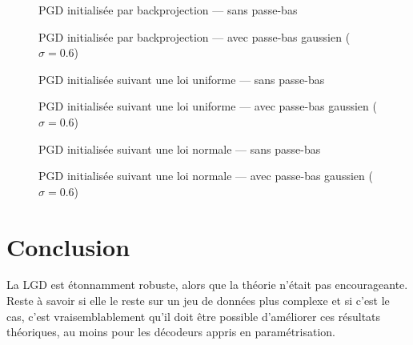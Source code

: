 \documentclass[hidelinks, french]{article} %
\theoremstyle{enonce}
\theoremstyle{special}
\theoremstyle{rq}
\theoremstyle{exo}
\theoremstyle{demo}
\begin{document}
\begin{figure}[H]\centering
	
	\caption{PGD initialisée par backprojection --- sans passe-bas}
	\label{fig:PGDbackproj-s}
\end{figure}

\begin{figure}[H]\centering
	
	\caption{PGD initialisée par backprojection --- avec passe-bas gaussien ($\sigma=0.6$)}
	\label{fig:PGDbackproj-g}
\end{figure}

\begin{figure}[H]\centering
	
	\caption{PGD initialisée suivant une loi uniforme --- sans passe-bas}
	\label{fig:PGDunif-s}
\end{figure}

\begin{figure}[H]\centering
	
	\caption{PGD initialisée suivant une loi uniforme --- avec passe-bas gaussien ($\sigma=0.6$)}
	\label{fig:PGDunif-g}
\end{figure}

\begin{figure}[H]\centering
	
	\caption{PGD initialisée suivant une loi normale --- sans passe-bas}
	\label{fig:PGDgauss-s}
\end{figure}

\begin{figure}[H]\centering
	
	\caption{PGD initialisée suivant une loi normale --- avec passe-bas gaussien ($\sigma=0.6$)}
	\label{fig:PGDgauss-g}
\end{figure}





\newpage



\section{Conclusion}
\quad

La LGD est étonnamment robuste, alors que la théorie n'était pas encourageante.  Reste à savoir si elle le reste sur un jeu de données plus complexe et si c'est le cas, c'est vraisemblablement qu'il doit être possible d'améliorer ces résultats théoriques, au moins pour les décodeurs appris en paramétrisation. 
\\
\end{document}
